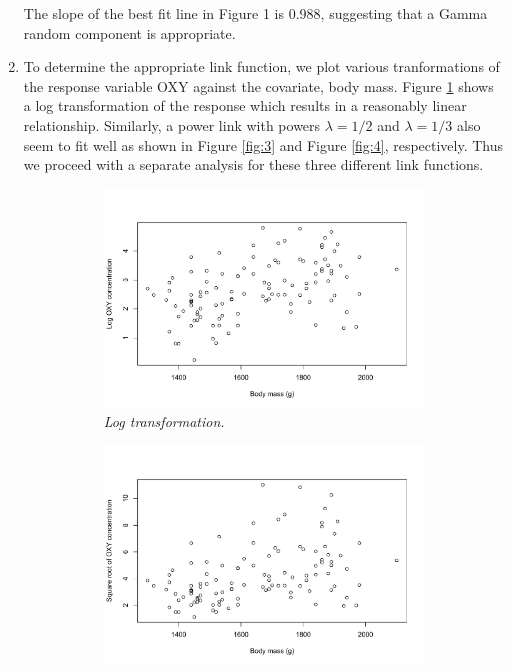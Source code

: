 \documentclass[12pt]{article}
\begin{document}
\begin{enumerate}
    The slope of the best fit line in Figure 1 is 0.988, suggesting that a Gamma random component is appropriate.

  \item To determine the appropriate link function, we plot various tranformations of the response variable OXY against the covariate, body mass.
    Figure \ref{fig:2} shows a log transformation of the response which results in a reasonably linear relationship. Similarly, a power link with
    powers $\lambda = 1/2$ and $\lambda = 1/3$ also seem to fit well as shown in Figure \ref{fig:3} and Figure \ref{fig:4}, respectively.
    Thus we proceed with a separate analysis for these three different link functions.
    
    \begin{figure}[h]
      \centering
      \caption{\emph{Various tranformations of the response OXY against the covariate body mass.}}
      \begin{subfigure}{0.6\textwidth}
        \centering
        \includegraphics[width=1\linewidth]{./figures/hw03_log_link.pdf}
        \caption{\emph{Log transformation.}}
        \label{fig:2}
      \end{subfigure}
      \begin{subfigure}{0.4\textwidth}
        \centering
        \includegraphics[width=1\linewidth]{./figures/hw03_sqrt_link.pdf}

\end{subfigure}
\end{figure}
\end{enumerate}
\end{document}
